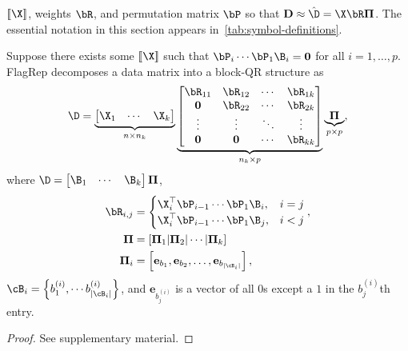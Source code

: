  $[\![\X]\!]$, weights $\bR$, and permutation matrix $\bP$ so that $\mathbf{D} \approx \hat{\D} = \X \bR\boldsymbol{\Pi}$. The essential notation in this section appears in~\cref{tab:symbol-definitions}.



\begin{prop}
    Suppose there exists some $[\![ \X ]\!]$ such that $\bP_i \cdots \bP_1 \B_i = \mathbf{0}$ for all $i=1,\dots,p$. FlagRep decomposes a data matrix into a block-QR structure as
    \begin{equation}\label{eq:reconstruction}
        \D 
        = \underbrace{\begin{bmatrix} \X_1 & \cdots & \X_k \end{bmatrix}}_{n \times n_k}
        \underbrace{\begin{bmatrix}
            \bR_{11} & \bR_{12} & \cdots & \bR_{1k}\\
            \mathbf{0} & \bR_{22} & \cdots & \bR_{2k}\\
            \vdots & \vdots & \ddots & \vdots\\
            \mathbf{0} & \mathbf{0} & \cdots & \bR_{kk}
        \end{bmatrix}}_{n_k \times p}\underbrace{\boldsymbol{\Pi}}_{p \times p},
    \end{equation}
    where $\D  = \begin{bmatrix} \B_1 & \cdots & \B_k \end{bmatrix}\boldsymbol{\Pi}$,
    \begin{align*}
        \bR_{i,j} &= 
        \begin{cases}
            \X_i^\top\bP_{i-1}\cdots \bP_1 \B_i, &i=j\\
            \X_i^\top\bP_{i-1}\cdots \bP_1 \B_j, &i < j
        \end{cases},\\
        \boldsymbol{\Pi} &= \left[\boldsymbol{\Pi}_1|\boldsymbol{\Pi}_2|\cdots|\boldsymbol{\Pi}_k\right]\\
        \boldsymbol{\Pi}_i &= \left[ \mathbf{e}_{b_1}, \mathbf{e}_{b_2}, \dots, \mathbf{e}_{b_{|\cB_i|}} \right],
    \end{align*}
    $\cB_i = \left \{b_1^{(i)}, \cdots b_{|\cB_i|}^{(i)}\right \}$, and $\mathbf{e}_{b_j^{(i)}}$ is a vector of all $0$s except a $1$ in the $b_j^{(i)}$th entry.
\end{prop}
\begin{proof}
    See supplementary material.
\end{proof}

